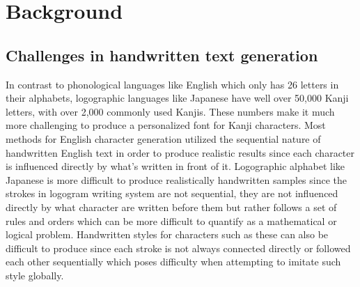\documentclass[12pt]{report}
\begin{document}
\newpage	
\chapter{Background}
\label{chap:background}

\section{Challenges in handwritten text generation}

In contrast to phonological languages like English which only has 26 letters in their alphabets, logographic languages like Japanese have well over 50,000 Kanji letters, with over 2,000 commonly used Kanjis. These numbers make it much more challenging to produce a personalized font for Kanji characters.
Most methods for English character generation utilized the sequential nature of handwritten English text in order to produce realistic results since each character is influenced directly by what’s written in front of it. Logographic alphabet like Japanese is more difficult to produce realistically handwritten samples since the strokes in logogram writing system are not sequential, they are not influenced directly by what character are written before them but rather follows a set of rules and orders which can be more difficult to quantify as a mathematical or logical problem. Handwritten styles for characters such as these can also be difficult to produce since each stroke is not always connected directly or followed each other sequentially which poses difficulty when attempting to imitate such style globally.
\end{document}
